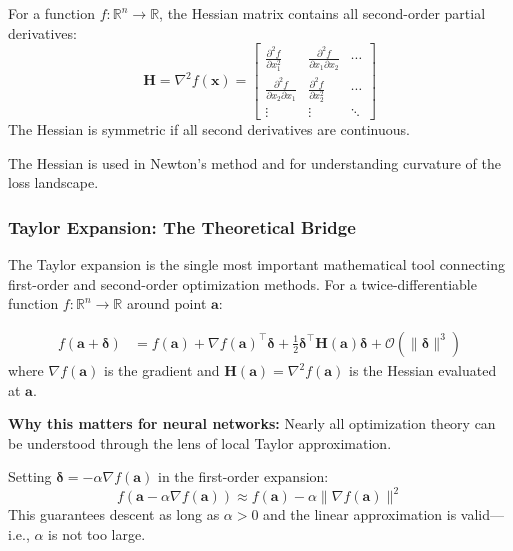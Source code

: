 \begin{definition}
For a function $f: \mathbb{R}^n \to \mathbb{R}$, the Hessian matrix contains all second-order partial derivatives:
\begin{equation}
\mathbf{H} = \nabla^2 f(\mathbf{x}) = \begin{bmatrix}
\frac{\partial^2 f}{\partial x_1^2} & \frac{\partial^2 f}{\partial x_1 \partial x_2} & \cdots \\
\frac{\partial^2 f}{\partial x_2 \partial x_1} & \frac{\partial^2 f}{\partial x_2^2} & \cdots \\
\vdots & \vdots & \ddots
\end{bmatrix}
\end{equation}
The Hessian is symmetric if all second derivatives are continuous.
\end{definition}

The Hessian is used in Newton's method and for understanding curvature of the loss landscape.

\subsubsection{Taylor Expansion: The Theoretical Bridge}

The Taylor expansion is the single most important mathematical tool connecting first-order and second-order optimization methods. For a twice-differentiable function $f: \mathbb{R}^n \to \mathbb{R}$ around point $\mathbf{a}$:

\begin{definition}
\begin{align}
f(\mathbf{a} + \boldsymbol{\delta}) &= f(\mathbf{a}) + \nabla f(\mathbf{a})^\top \boldsymbol{\delta} + \frac{1}{2}\boldsymbol{\delta}^\top \mathbf{H}(\mathbf{a})\boldsymbol{\delta} + \mathcal{O}(\|\boldsymbol{\delta}\|^3)
\end{align}
where $\nabla f(\mathbf{a})$ is the gradient and $\mathbf{H}(\mathbf{a}) = \nabla^2 f(\mathbf{a})$ is the Hessian evaluated at $\mathbf{a}$.
\end{definition}

\textbf{Why this matters for neural networks:} Nearly all optimization theory can be understood through the lens of local Taylor approximation.

\begin{example}
Setting $\boldsymbol{\delta} = -\alpha \nabla f(\mathbf{a})$ in the first-order expansion:
\begin{equation}
f(\mathbf{a} - \alpha \nabla f(\mathbf{a})) \approx f(\mathbf{a}) - \alpha \|\nabla f(\mathbf{a})\|^2
\end{equation}
This guarantees descent as long as $\alpha > 0$ and the linear approximation is valid---i.e., $\alpha$ is not too large.
\end{example}

